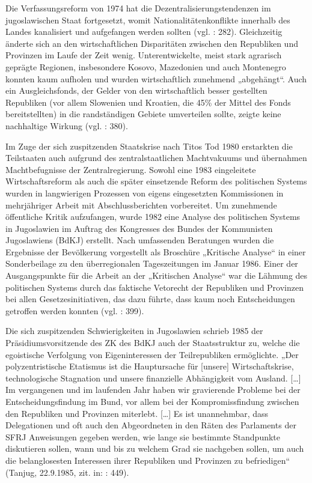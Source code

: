Die Verfassungsreform von 1974 hat die Dezentralisierungstendenzen im jugoslawischen Staat fortgesetzt, womit Nationalitätenkonflikte innerhalb des Landes kanalisiert und aufgefangen werden sollten (vgl. \cite{roggemann} : 282). Gleichzeitig änderte sich an den wirtschaftlichen Disparitäten zwischen den Republiken und Provinzen im Laufe der Zeit wenig. Unterentwickelte, meist stark agrarisch geprägte Regionen, insbesondere Kosovo, Mazedonien und auch Montenegro konnten kaum aufholen und wurden wirtschaftlich zunehmend „abgehängt“. Auch ein Ausgleichsfonds, der Gelder von den wirtschaftlich besser gestellten Republiken (vor allem Slowenien und Kroatien, die 45\% der Mittel des Fonds bereitstellten) in die randständigen Gebiete umverteilen sollte, zeigte keine nachhaltige Wirkung (vgl. \cite{ramet} : 380).\par
Im Zuge der sich zuspitzenden Staatskrise nach Titos Tod 1980 erstarkten die Teilstaaten auch aufgrund des zentralstaatlichen Machtvakuums und übernahmen Machtbefugnisse der Zentralregierung. Sowohl eine 1983 eingeleitete Wirtschaftsreform als auch die später einsetzende Reform des politischen Systems wurden in langwierigen Prozessen von eigens eingesetzten Kommissionen in mehrjähriger Arbeit mit Abschlussberichten vorbereitet. Um zunehmende öffentliche Kritik aufzufangen, wurde 1982 eine Analyse des politischen Systems in Jugoslawien im Auftrag des Kongresses des Bundes der Kommunisten Jugoslawiens (BdKJ) erstellt. Nach umfassenden Beratungen wurden die Ergebnisse der Bevölkerung vorgestellt als Broschüre „Kritische Analyse“ in einer Sonderbeilage zu den überregionalen Tageszeitungen im Januar 1986. Einer der Ausgangspunkte für die Arbeit an der „Kritischen Analyse“ war die Lähmung des politischen Systems durch das faktische Vetorecht der Republiken und Provinzen bei allen Gesetzesinitiativen, das dazu führte, dass kaum noch Entscheidungen getroffen werden konnten (vgl. \cite{reuter} : 399).\par
Die sich zuspitzenden Schwierigkeiten in Jugoslawien schrieb 1985 der Präsidiumsvorsitzende des ZK des BdKJ auch der Staatsstruktur zu, welche die egoistische Verfolgung von Eigeninteressen der Teilrepubliken ermöglichte. „Der polyzentristische Etatismus ist die Hauptursache für [unsere] Wirtschaftskrise, technologische Stagnation und unsere finanzielle Abhängigkeit vom Ausland. […] Im vergangenen und im laufenden Jahr haben wir gravierende Probleme bei der Entscheidungsfindung im Bund, vor allem bei der Kompromissfindung zwischen den Republiken und Provinzen miterlebt. […] Es ist unannehmbar, dass Delegationen und oft auch den Abgeordneten in den Räten des Parlaments der SFRJ Anweisungen gegeben werden, wie lange sie bestimmte Standpunkte diskutieren sollen, wann und bis zu welchem Grad sie nachgeben sollen, um auch die belanglosesten Interessen ihrer Republiken und Provinzen zu befriedigen“ (Tanjug, 22.9.1985, zit. in:  \cite{ramet} : 449).\par
